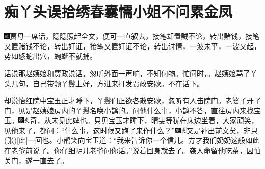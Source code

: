 \chapter{痴丫头误拾绣春囊\hspace{.5em}懦小姐不问累金凤}
{\includegraphics[width=3mm]{../Images/00005}\kaishu 贾母一席话，隐隐照起全文，便可一直叙去，接笔却置贼不论，转出赌钱，接笔又置赌钱不论，转出奸证，接笔又置奸证不论，转出讨情，一波未平，一波又起，势如怒蛇出穴，蜿蜒不就捕。}

话说那赵姨娘和贾政说话，忽听外面一声响，不知何物。忙问时，。赵姨娘骂了丫头几句，自己带领丫鬟上好，方进来打发贾政安歇。不在话下。

却说怡红院中宝玉正才睡下，丫鬟们正欲各散安歇，忽听有人击院门。老婆子开了门，见是赵姨娘房内的丫鬟名唤小鹊的。问他什么事，小鹊不答，直往房内来找宝玉。{\includegraphics[width=3mm]{../Images/00004}\includegraphics[width=3mm]{../Images/00012}\footnotesize \kaishu 奇，从未见此婢也。}只见宝玉才睡下，晴雯等犹在床边坐着，大家顽笑，见他来了，都问：``什么事，这时候又跑了来作什么？''{\includegraphics[width=3mm]{../Images/00004}\includegraphics[width=3mm]{../Images/00012}\footnotesize \kaishu 又是补出前文矣，非只{(张)}{[}此{]}一回也。}小鹊笑向宝玉道：``我来告诉你一个信儿。方才我们奶奶这般如此在老爷前说了。你仔细明儿老爷问你话。''说着回身就去了。袭人命留他吃茶，因怕关门，遂一直去了。

